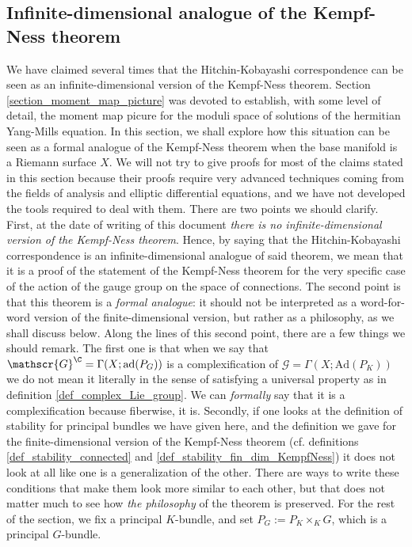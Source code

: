 \subsection{Infinite-dimensional analogue of the Kempf-Ness theorem} \label{section_inf_dim_Kempf_Ness}
We have claimed several times that the Hitchin-Kobayashi correspondence can be seen as an infinite-dimensional version of the Kempf-Ness theorem. Section \ref{section_moment_map_picture} was devoted to establish, with some level of detail, the moment map picure for the moduli space of solutions of the hermitian Yang-Mills equation. In this section, we shall explore how this situation can be seen as a formal analogue of the Kempf-Ness theorem when the base manifold is a Riemann surface \(X\). We will not try to give proofs for most of the claims stated in this section because their proofs require very advanced techniques coming from the fields of analysis and elliptic differential equations, and we have not developed the tools required to deal with them. There are two points we should clarify. First, at the date of writing of this document \textit{there is no infinite-dimensional version of the Kempf-Ness theorem}. Hence, by saying that the Hitchin-Kobayashi correspondence is an infinite-dimensional analogue of said theorem, we mean that it is a proof of the statement of the Kempf-Ness theorem for the very specific case of the action of the gauge group on the space of connections. The second point is that this theorem is a \textit{formal analogue}: it should not be interpreted as a word-for-word version of the finite-dimensional version, but rather as a philosophy, as we shall discuss below. Along the lines of this second point, there are a few things we should remark. The first one is that when we say that \(\mathscr{G}^\C=\Gamma(X; \mathrm{ad}(P_G))\) is a complexification of \(\mathscr{G}=\Gamma(X; \mathrm{Ad}(P_K))\) we do not mean it literally in the sense of satisfying a universal property as in definition \ref{def_complex_Lie_group}. We can \textit{formally} say that it is a complexification because fiberwise, it is. Secondly, if one looks at the definition of stability for principal bundles we have given here, and the definition we gave for the finite-dimensional version of the Kempf-Ness theorem (cf. definitions \ref{def_stability_connected} and \ref{def_stability_fin_dim_KempfNess}) it does not look at all like one is a generalization of the other. There are ways to write these conditions that make them look more similar to each other, but that does not matter much to see how \textit{the philosophy} of the theorem is preserved. For the rest of the section, we fix a principal \(K\)-bundle, and set \(P_G:=P_K \times_K G\), which is a principal \(G\)-bundle. 

